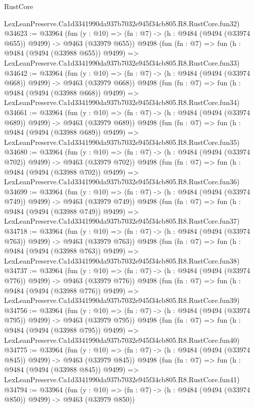 \begin{lexlean}{RustCore}
\begin{coremodule}
    LexLeanPreserve.Ca1d3341990da937b7032e945f34cb805.R8.RustCore.fun32)
@34623 := @33964
    (fun (y : @10) => (fn : @7) -> (h : @9484 (@9494 (@33974 @655)) @9499) -> @9463 (@33979 @655))
    @9498
    (fun (fn : @7) =>
    fun (h : @9484 (@9494 (@33988 @655)) @9499) =>
    LexLeanPreserve.Ca1d3341990da937b7032e945f34cb805.R8.RustCore.fun33)
@34642 := @33964
    (fun (y : @10) => (fn : @7) -> (h : @9484 (@9494 (@33974 @668)) @9499) -> @9463 (@33979 @668))
    @9498
    (fun (fn : @7) =>
    fun (h : @9484 (@9494 (@33988 @668)) @9499) =>
    LexLeanPreserve.Ca1d3341990da937b7032e945f34cb805.R8.RustCore.fun34)
@34661 := @33964
    (fun (y : @10) => (fn : @7) -> (h : @9484 (@9494 (@33974 @689)) @9499) -> @9463 (@33979 @689))
    @9498
    (fun (fn : @7) =>
    fun (h : @9484 (@9494 (@33988 @689)) @9499) =>
    LexLeanPreserve.Ca1d3341990da937b7032e945f34cb805.R8.RustCore.fun35)
@34680 := @33964
    (fun (y : @10) => (fn : @7) -> (h : @9484 (@9494 (@33974 @702)) @9499) -> @9463 (@33979 @702))
    @9498
    (fun (fn : @7) =>
    fun (h : @9484 (@9494 (@33988 @702)) @9499) =>
    LexLeanPreserve.Ca1d3341990da937b7032e945f34cb805.R8.RustCore.fun36)
@34699 := @33964
    (fun (y : @10) => (fn : @7) -> (h : @9484 (@9494 (@33974 @749)) @9499) -> @9463 (@33979 @749))
    @9498
    (fun (fn : @7) =>
    fun (h : @9484 (@9494 (@33988 @749)) @9499) =>
    LexLeanPreserve.Ca1d3341990da937b7032e945f34cb805.R8.RustCore.fun37)
@34718 := @33964
    (fun (y : @10) => (fn : @7) -> (h : @9484 (@9494 (@33974 @763)) @9499) -> @9463 (@33979 @763))
    @9498
    (fun (fn : @7) =>
    fun (h : @9484 (@9494 (@33988 @763)) @9499) =>
    LexLeanPreserve.Ca1d3341990da937b7032e945f34cb805.R8.RustCore.fun38)
@34737 := @33964
    (fun (y : @10) => (fn : @7) -> (h : @9484 (@9494 (@33974 @776)) @9499) -> @9463 (@33979 @776))
    @9498
    (fun (fn : @7) =>
    fun (h : @9484 (@9494 (@33988 @776)) @9499) =>
    LexLeanPreserve.Ca1d3341990da937b7032e945f34cb805.R8.RustCore.fun39)
@34756 := @33964
    (fun (y : @10) => (fn : @7) -> (h : @9484 (@9494 (@33974 @795)) @9499) -> @9463 (@33979 @795))
    @9498
    (fun (fn : @7) =>
    fun (h : @9484 (@9494 (@33988 @795)) @9499) =>
    LexLeanPreserve.Ca1d3341990da937b7032e945f34cb805.R8.RustCore.fun40)
@34775 := @33964
    (fun (y : @10) => (fn : @7) -> (h : @9484 (@9494 (@33974 @845)) @9499) -> @9463 (@33979 @845))
    @9498
    (fun (fn : @7) =>
    fun (h : @9484 (@9494 (@33988 @845)) @9499) =>
    LexLeanPreserve.Ca1d3341990da937b7032e945f34cb805.R8.RustCore.fun41)
@34794 := @33964
    (fun (y : @10) => (fn : @7) -> (h : @9484 (@9494 (@33974 @850)) @9499) -> @9463 (@33979 @850))

\end{coremodule}
\end{lexlean}
